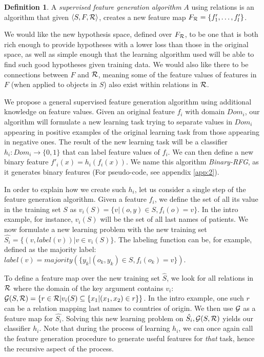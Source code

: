 \documentclass{article}
\theoremstyle{definition}
\newtheorem{defn}{Definition}[section]
\begin{document}
\begin{defn}
	A \emph{supervised feature generation algorithm} $A$ using relations is an algorithm that given $\langle S,F,{\cal R} \rangle$, creates a new feature map $F_{\cal R}=\{f'_{1},\ldots,f'_{l}\}$.
\end{defn}

We would like the new hypothesis space, defined over $F_{\cal R}$, to be one that is both rich enough to provide hypotheses with a lower loss than those in the original space, as well as simple enough that the learning algorithm used will be able to find such good hypotheses given training data.
We would also like there to be connections between $F$ and ${\cal R}$, meaning some of the feature values of features in $F$ (when applied to objects in $S$) also exist within relations in $\cal R$.

We propose a general supervised feature generation algorithm using additional knowledge on feature values.
Given an original feature $f_{i}$ with domain $Dom_i$, our algorithm will formulate a new learning task trying to separate values in $Dom_i$ appearing in positive examples of the original learning task from those appearing in negative ones.  The result of the new learning task will be a classifier
$h_{i}:Dom_{i}\rightarrow \{0,1\}$ that can label feature values of $f_{i}$. We can then define a new binary feature $f'_{i}(x)=h_{i}(f_{i}(x))$.
We name this algorithm \emph{Binary-RFG}, as it generates binary features (For pseudo-code, see appendix \ref{app:2}).

In order to explain how we create such $h_{i}$, let us consider a single step of the feature generation algorithm.
Given a feature $f_{i}$, we define the set of all its value in the training set $S$ as $v_i(S) = \{v | (o,y) \in S, f_{i}(o)=v\}$. In the intro example, for instance, $v_i(S)$ will be the set of all last names of patients.
We now formulate a new learning problem with the new training set
$\hat{S_i} = \{ (v, label(v)) | v \in v_i(S) \}$.
The labeling function can be, for example, defined as
the majority label: $label(v)=majority(\{y_k| \left(o_k,y_k \right) \in S, f_{i}(o_k)=v\})$.

To define a feature map over the new training set $\hat{S}$, we look for all relations in $\cal R$ where the domain of the key argument contains $v_i$:
${\cal G}(S,{\cal R}) = \left\{ r \in {\cal R} | v_i(S) \subseteq \{x_1 | (x_1,x_2) \in r\}\right\}$. In the intro example, one such $r$ can be a relation mapping last names to countries of origin. We then use ${\cal G}$ as a feature map for $\hat{S_i}$.
Solving this new learning problem on $\hat{S_i}, {\cal G}(S,{\cal R})$ yields our classifier $h_{i}$.
Note that during the process of learning $h_{i}$, we can once again call the feature generation procedure to generate useful features for \emph{that} task, hence the recursive aspect of the process.
\end{document}
